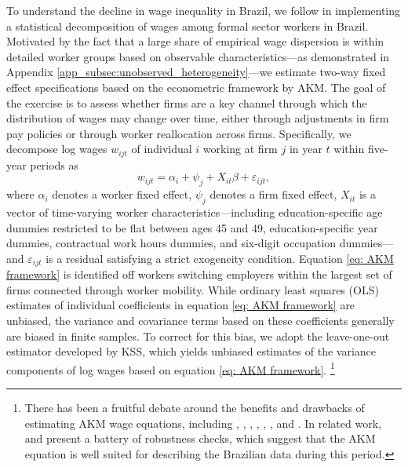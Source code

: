To understand the decline in wage inequality in Brazil, we follow \citet{ABEM2018} in implementing a statistical decomposition of wages among formal sector workers in Brazil. Motivated by the fact that a large share of empirical wage dispersion is within detailed worker groups based on observable characteristics---as demonstrated in Appendix \ref{app_subsec:unobserved_heterogeneity}---we estimate two-way fixed effect specifications based on the econometric framework by AKM. The goal of the exercise is to assess whether firms are a key channel through which the distribution of wages may change over time, either through adjustments in firm pay policies or through worker reallocation across firms. Specifically, we decompose log wages $w_{ijt}$ of individual $i$ working at firm $j$ in year $t$ within five-year periods as
%
\begin{equation}
  w_{ijt}=\alpha_{i}+\psi_{j} + X_{it}\beta +\varepsilon_{ijt},\label{eq: AKM framework}
\end{equation}
%
where $\alpha_{i}$ denotes a worker fixed effect, $\psi_{j}$ denotes a firm fixed effect, $X_{it}$ is a vector of time-varying worker characteristics---including education-specific age dummies restricted to be flat between ages 45 and 49, education-specific year dummies, contractual work hours dummies, and six-digit occupation dummies---and $\varepsilon_{ijt}$ is a residual satisfying a strict exogeneity condition. %
%
Equation \eqref{eq: AKM framework} is identified off workers switching employers within the largest set of firms connected through worker mobility. While ordinary least squares (OLS) estimates of individual coefficients in equation \eqref{eq: AKM framework} are unbiased, the variance and covariance terms based on these coefficients generally are biased in finite samples. To correct for this bias, we adopt the leave-one-out estimator developed by KSS, which yields unbiased estimates of the variance components of log wages based on equation \eqref{eq: AKM framework}.%
%
\footnote{There has been a fruitful debate around the benefits and drawbacks of estimating AKM wage equations, including \citet{Andrews2008}, \citet{EeckhoutKircher2011}, \citet{Lopesdemelo2016}, \citet{Card2018}, \citet{BonhommeLamadonManresa2019}, \citet{BonhommeHolzheuLamadonManresaMogstadSetzler2020}, and \citet{Borovickova2020}. In related work, \citet{ABEM2018} and \citet{GerardLagosSeverniniCard2020} present a battery of robustness checks, which suggest that the AKM equation is well suited for describing the Brazilian data during this period.} %
%

